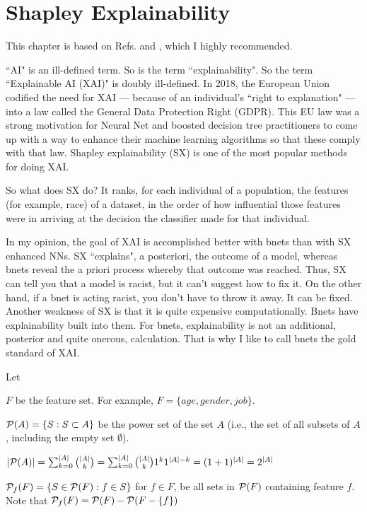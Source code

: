 \chapter{Shapley Explainability}

This chapter
is based on 
Refs.\cite{maz-shap-titanic}
and \cite{maz-shap-income},
which I highly recommended.


\label{ch-shapley}
``AI" is an ill-defined term. 
So is the term ``explainability". 
So the term ``Explainable 
AI (XAI)" is doubly ill-defined.
In 2018, the European Union codified 
the need for XAI ---
because of an individual’s ``right to
 explanation" ---
into a law called the General Data Protection 
Right (GDPR). This EU law was a strong 
motivation for Neural Net  
and boosted decision tree practitioners 
to come up with a way to enhance  
their machine learning algorithms
so that these comply with that law. Shapley 
explainability (SX) is 
one of the most popular 
methods for doing XAI.

So what does SX do? It ranks, for each individual 
of a population, the features (for example, race)
of a dataset, in the order of how influential those
features were in arriving at the decision the 
classifier made for that individual.

In my opinion, the goal of XAI is 
accomplished better with
bnets
 than with SX enhanced NNs.
SX ``explains", a posteriori, the outcome of a model, 
whereas bnets reveal the a priori process whereby 
that outcome was reached. Thus, SX can tell you 
that a model is racist, but it can't suggest 
how to fix it. On the other hand, if a bnet 
is acting racist, you don't have to throw it away. 
It can be fixed. 
Another
weakness of SX is that
it is quite expensive
computationally.
Bnets have explainability
built into them.
For bnets, explainability is
not an additional, posterior and quite
onerous, calculation.
That is why I like to call 
bnets the gold standard of XAI.

Let

$F$ be the feature set. For example,
$F=\{age, gender, job\}$. 

${\cal P}(A)=
\{S: S\subset A \}$ be the power 
set of the set $A$ (i.e., the
set of all subsets of $A$, including
the empty set $\emptyset$).

$|{\cal P}(A)|=\sum_{k=0}^{|A|} {|A|\choose k} =
\sum_{k=0}^{|A|} {|A|\choose k}1^k 1^{|A|-k}
= (1+1)^{|A|}=2^{|A|}$


${\cal P}_f(F)=\{S\in {\cal P}(F): f\in S\}$
for $f\in F$, be all sets in ${\cal P}(F)$
containing feature $f$. Note that 
 ${\cal P}_f(F)= {\cal P}(F)-{\cal P}(F-\{f\})$

